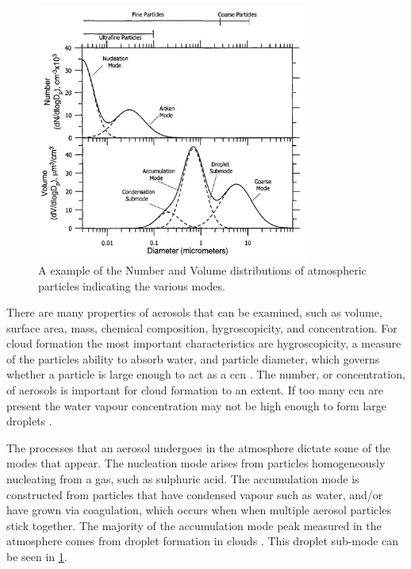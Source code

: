 	\begin{figure}[!htb]
	 	\centering
	 	\includegraphics[width=0.8\textwidth,natwidth=1302,natheight=1222]{Fig/Literature_Review/aerosolmodes.png}
	 	\caption{A example of the Number and Volume distributions of atmospheric particles indicating the various modes. \citep[Chapter 8]{seinfeld2012atmospheric}}
	 	\label{fig:aermode}
	\end{figure}

	There are many properties of aerosols that can be examined, such as volume, surface area, mass, chemical composition, hygroscopicity, and concentration. For cloud formation the most important characteristics are hygroscopicity, a measure of the particles ability to absorb water, and particle diameter, which governs whether a particle is large enough to act as a \gls{ccn} \citep[Chapter 6]{rogers1989short}. The number, or concentration, of aerosols is important for cloud formation to an extent. If too many \gls{ccn} are present the water vapour concentration may not be high enough to form large droplets \citep[Chapter 22]{seinfeld2012atmospheric}.

	The processes that an aerosol undergoes in the atmosphere dictate some of the modes that appear. The nucleation mode arises from particles homogeneously nucleating from a gas, such as sulphuric acid. The accumulation mode is constructed from particles that have condensed vapour such as water, and/or have grown via coagulation, which occurs when when multiple aerosol particles stick together. The majority of the accumulation mode peak measured in the atmosphere comes from droplet formation in clouds \citep[Chapter 8]{seinfeld2012atmospheric}. This droplet sub-mode can be seen in \cref{fig:aermode}.

